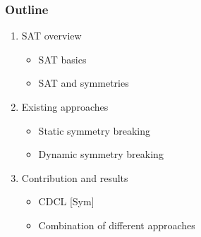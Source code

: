 \documentclass{beamer}
\begin{document}
\begin{frame}
\frametitle{Outline}
\begin{enumerate}
	\item \textcolor{UPMCEngagementBlueB}{SAT overview}
	\begin{itemize}
		\item[] SAT basics
		\item[] SAT and symmetries
	\end{itemize}
	\vspace{5pt}
	\item \textcolor{UPMCEngagementBlueB}{Existing approaches}
	\begin{itemize}
		\item[] Static symmetry breaking
		\item[] Dynamic symmetry breaking
	\end{itemize}
	\vspace{5pt}
	\item \textcolor{UPMCEngagementBlueB}{Contribution and results} 
	\begin{itemize}
		\item[] CDCL [Sym]
		\item[] Combination of different approaches
	\end{itemize}
\end{enumerate}
\end{frame}

%
%
%
%
%


\end{document}
